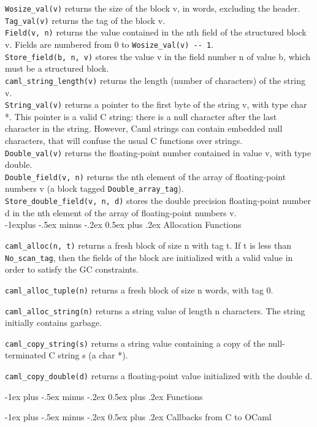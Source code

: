 \documentclass[10pt,landscape]{article}
\makeatletter
\renewcommand{\section}{\@startsection{section}{1}{0mm}%
        {-1ex plus -.5ex minus -.2ex}%
        {0.5ex plus .2ex}%
        {\normalfont\large\bfseries}}
\renewcommand{\subsection}{\@startsection{subsection}{2}{0mm}%
        {-1explus -.5ex minus -.2ex}%
        {0.5ex plus .2ex}%
        {\normalfont\normalsize\bfseries}}
\makeatother
\begin{document}
\begin{multicols}{3}
\verb!Wosize_val(v)! returns the size of the block v, in words, excluding the header.\\
\verb!Tag_val(v)! returns the tag of the block v.\\
\verb!Field(v, n)! returns the value contained in the nth field of the structured block v. Fields are numbered from 0 to \verb!Wosize_val(v) -- 1!.\\
\verb!Store_field(b, n, v)! stores the value v in the field number n of value b, which must be a structured block.\\
\verb!caml_string_length(v)! returns the length (number of characters) of the string v. \\
\verb!String_val(v)! returns a pointer to the first byte of the string
v, with type char *. This pointer is a valid C string: there is a null
character after the last character in the string.  However, Caml
strings can contain embedded null characters, that will confuse the
usual C functions over strings.\\
\verb!Double_val(v)! returns the floating-point number contained in
value v, with type double.\\
\verb!Double_field(v, n)! returns the nth element of the array of
floating-point numbers v (a block tagged \verb!Double_array_tag!).\\
\verb!Store_double_field(v, n, d)! stores the double precision
floating-point number d in the nth element of the array of
floating-point numbers v. \\

\subsection{Allocation Functions}

\verb!caml_alloc(n, t)! returns a fresh block of size n with tag t. If t is less than \verb!No_scan_tag!, then
the fields of the block are initialized with a valid value in order to satisfy the GC constraints.

\verb!caml_alloc_tuple(n)! returns a fresh block of size n words, with tag 0.

\verb!caml_alloc_string(n)! returns a string value of length n
characters. The string initially contains garbage.

\verb!caml_copy_string(s)! returns a string value containing a copy of
the null-terminated C string s (a char *).

\verb!caml_copy_double(d)! returns a floating-point value initialized
with the double d.


\section{Functions}

\section{Callbacks from C to OCaml}

\end{multicols}
\end{document}
